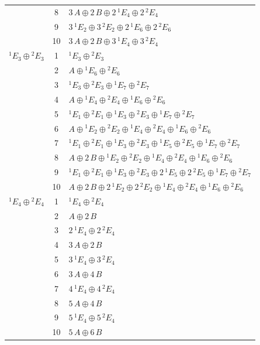 \documentclass[11pt]{article}
\begin{document}
\begin{longtable}{l c p{}}
 & 8 & $3\,A\oplus 2\,B\oplus 2\,{}^{1}E_{4}\oplus 2\,{}^{2}E_{4}$\\
 & 9 & $3\,{}^{1}E_{2}\oplus 3\,{}^{2}E_{2}\oplus 2\,{}^{1}E_{6}\oplus 2\,{}^{2}E_{6}$\\
 & 10 & $3\,A\oplus 2\,B\oplus 3\,{}^{1}E_{4}\oplus 3\,{}^{2}E_{4}$\\
\hline
${}^{1}E_{3}\oplus {}^{2}E_{3}$ & 1 & ${}^{1}E_{3}\oplus {}^{2}E_{3}$\\
 & 2 & $A\oplus {}^{1}E_{6}\oplus {}^{2}E_{6}$\\
 & 3 & ${}^{1}E_{3}\oplus {}^{2}E_{3}\oplus {}^{1}E_{7}\oplus {}^{2}E_{7}$\\
 & 4 & $A\oplus {}^{1}E_{4}\oplus {}^{2}E_{4}\oplus {}^{1}E_{6}\oplus {}^{2}E_{6}$\\
 & 5 & ${}^{1}E_{1}\oplus {}^{2}E_{1}\oplus {}^{1}E_{3}\oplus {}^{2}E_{3}\oplus {}^{1}E_{7}\oplus {}^{2}E_{7}$\\
 & 6 & $A\oplus {}^{1}E_{2}\oplus {}^{2}E_{2}\oplus {}^{1}E_{4}\oplus {}^{2}E_{4}\oplus {}^{1}E_{6}\oplus {}^{2}E_{6}$\\
 & 7 & ${}^{1}E_{1}\oplus {}^{2}E_{1}\oplus {}^{1}E_{3}\oplus {}^{2}E_{3}\oplus {}^{1}E_{5}\oplus {}^{2}E_{5}\oplus {}^{1}E_{7}\oplus {}^{2}E_{7}$\\
 & 8 & $A\oplus 2\,B\oplus {}^{1}E_{2}\oplus {}^{2}E_{2}\oplus {}^{1}E_{4}\oplus {}^{2}E_{4}\oplus {}^{1}E_{6}\oplus {}^{2}E_{6}$\\
 & 9 & ${}^{1}E_{1}\oplus {}^{2}E_{1}\oplus {}^{1}E_{3}\oplus {}^{2}E_{3}\oplus 2\,{}^{1}E_{5}\oplus 2\,{}^{2}E_{5}\oplus {}^{1}E_{7}\oplus {}^{2}E_{7}$\\
 & 10 & $A\oplus 2\,B\oplus 2\,{}^{1}E_{2}\oplus 2\,{}^{2}E_{2}\oplus {}^{1}E_{4}\oplus {}^{2}E_{4}\oplus {}^{1}E_{6}\oplus {}^{2}E_{6}$\\
\hline
${}^{1}E_{4}\oplus {}^{2}E_{4}$ & 1 & ${}^{1}E_{4}\oplus {}^{2}E_{4}$\\
 & 2 & $A\oplus 2\,B$\\
 & 3 & $2\,{}^{1}E_{4}\oplus 2\,{}^{2}E_{4}$\\
 & 4 & $3\,A\oplus 2\,B$\\
 & 5 & $3\,{}^{1}E_{4}\oplus 3\,{}^{2}E_{4}$\\
 & 6 & $3\,A\oplus 4\,B$\\
 & 7 & $4\,{}^{1}E_{4}\oplus 4\,{}^{2}E_{4}$\\
 & 8 & $5\,A\oplus 4\,B$\\
 & 9 & $5\,{}^{1}E_{4}\oplus 5\,{}^{2}E_{4}$\\
 & 10 & $5\,A\oplus 6\,B$\\

\end{longtable}
\end{document}
